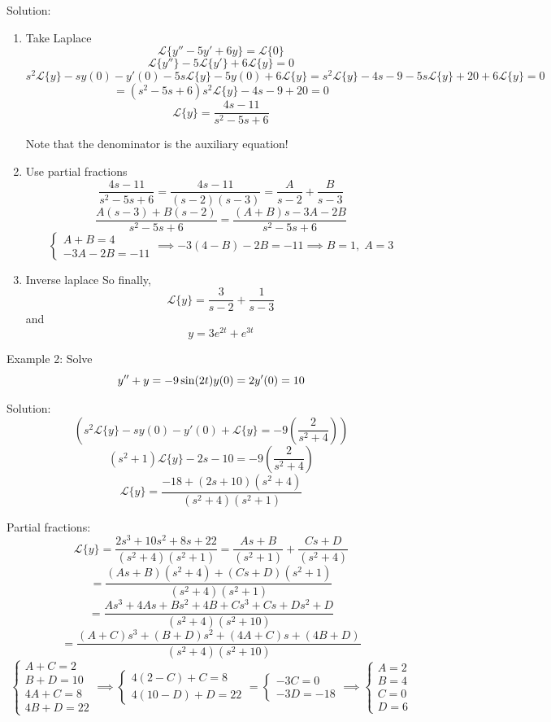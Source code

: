 \documentclass[12pt]{article}
\renewcommand{\L}[1]{\mathcal{L}\{#1\}}
\begin{document}
Solution:
\begin{enumerate}
    \item Take Laplace
    \[\L{y'' - 5y' + 6y} = \L{0}\]
    \[\L{y''} - 5\L{y'} + 6\L{y} = 0\]
    \[s^2\L{y} - sy(0) - y'(0) - 5s\L{y} - 5y(0) + 6\L{y} = s^2\L{y} - 4s - 9 - 5s\L{y} + 20 + 6\L{y} = 0\]
    \[= (s^2 - 5s + 6)s^2\L{y} - 4s - 9 + 20 = 0\]
    \[\L{y} = \frac{4s - 11}{s^2 - 5s + 6}\]

    Note that the denominator is the auxiliary equation!

    \item Use partial fractions
    \[\frac{4s - 11}{s^2 - 5s + 6} = \frac{4s - 11}{(s - 2)(s - 3)} = \frac{A}{s-2} + \frac{B}{s - 3}\]
    \[\frac{A(s-3) + B(s-2)}{s^2 - 5s + 6} = \frac{(A+B)s - 3A - 2B}{s^2 - 5s + 6}\]
    \[\begin{cases}
        A + B = 4\\
        -3A - 2B = -11
    \end{cases} \implies -3(4 - B) - 2B = -11 \implies B = 1, \; A = 3\]  
   
    \item Inverse laplace 
    So finally, 
    \[\L{y} = \frac{3}{s-2} + \frac{1}{s - 3}\]
    and 
    \[\boxed{y = 3e^{2t} + e^{3t}}\]
\end{enumerate}

Example 2: Solve 
\[y'' + y = -9\sin (2t)\\
y(0) = 2\\
y'(0) = 10\]

Solution:
\[(s^2 \L{y} - sy(0) - y'(0) + \L{y} = -9 \left(\frac{2}{s^2 + 4}\right))\]
\[(s^2 + 1) \L{y} - 2s - 10 = -9 \left(\frac{2}{s^2 + 4}\right) \]
\[\L{y} = \frac{-18 + (2s + 10)(s^2 + 4)}{(s^2 + 4)(s^2 + 1)}\]

Partial fractions:
\[\L{y} = \frac{2s^3 + 10s^2 + 8s + 22}{(s^2 + 4)(s^2 + 1)} = \frac{As + B}{(s^2 + 1)} + \frac{Cs + D}{(s^2 + 4)}\]
\[= \frac{(As + B)(s^2 + 4) + (Cs + D)(s^2 + 1)}{(s^2 + 4)(s^2 + 1)}\]
\[= \frac{As^3 + 4As + Bs^2 + 4B + Cs^3 + Cs + Ds^2 + D}{(s^2 + 4)(s^2 + 10)}\] 
\[= \frac{(A + C)s^3 + (B + D)s^2 + (4A + C)s + (4B + D)}{(s^2 + 4)(s^2 + 10)}\]
\[\begin{cases}
    A + C = 2\\
    B + D = 10\\
    4A + C = 8\\
    4B + D = 22
\end{cases} \implies \begin{cases}
    4(2 - C) + C = 8\\
    4(10 - D) + D = 22
\end{cases} = \begin{cases}
    -3C = 0\\
    -3D = -18
\end{cases} \implies \begin{cases}
    A = 2\\
    B = 4\\
    C = 0\\
    D = 6
\end{cases}\]
\end{document}
